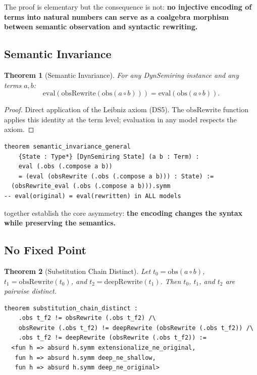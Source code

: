 \documentclass[11pt,a4paper]{article}
\newtheorem{theorem}{Theorem}[section]
\theoremstyle{definition}
\theoremstyle{remark}
\newcommand{\compose}{\mathbin{\circ}}
\newcommand{\obs}{\mathrm{obs}}
\newcommand{\eval}{\mathrm{eval}}
\newcommand{\obsRewrite}{\mathrm{obsRewrite}}
\newcommand{\deepRewrite}{\mathrm{deepRewrite}}
\begin{document}
The proof is elementary but the consequence is not: \textbf{no injective
encoding of terms into natural numbers can serve as a coalgebra morphism
between semantic observation and syntactic rewriting.}

\subsection{Semantic Invariance}

\begin{theorem}[Semantic Invariance]
\label{thm:sem-inv}
For any DynSemiring instance and any terms $a, b$:
\[
  \eval(\obsRewrite(\obs(a \compose b))) = \eval(\obs(a \compose b)).
\]
\end{theorem}

\begin{proof}
Direct application of the Leibniz axiom (DS5). The $\obsRewrite$ function
applies this identity at the term level; evaluation in any model respects
the axiom.
\end{proof}

\begin{lstlisting}[caption={Semantic invariance (Obstruction/Encoding.lean)}]
theorem semantic_invariance_general
    {State : Type*} [DynSemiring State] (a b : Term) :
    eval (.obs (.compose a b))
    = (eval (obsRewrite (.obs (.compose a b))) : State) :=
  (obsRewrite_eval (.obs (.compose a b))).symm
-- eval(original) = eval(rewritten) in ALL models
\end{lstlisting}

 together establish the core asymmetry:
\textbf{the encoding changes the syntax while preserving the semantics.}

\subsection{No Fixed Point}

\begin{theorem}[Substitution Chain Distinct]
\label{thm:no-fixpoint}
Let $t_0 = \obs(a \compose b)$,
$t_1 = \obsRewrite(t_0)$, and
$t_2 = \deepRewrite(t_1)$.
Then $t_0$, $t_1$, and $t_2$ are pairwise distinct.
\end{theorem}

\begin{lstlisting}[caption={No fixed point (Obstruction/Encoding.lean)}]
theorem substitution_chain_distinct :
    .obs t_f2 != obsRewrite (.obs t_f2) /\
    obsRewrite (.obs t_f2) != deepRewrite (obsRewrite (.obs t_f2)) /\
    .obs t_f2 != deepRewrite (obsRewrite (.obs t_f2)) :=
  <fun h => absurd h.symm extensionalize_ne_original,
   fun h => absurd h.symm deep_ne_shallow,
   fun h => absurd h.symm deep_ne_original>
\end{lstlisting}
\end{document}
